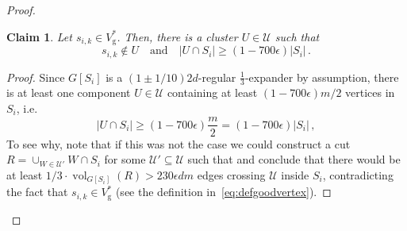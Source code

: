 \documentclass[epsfig,letter,11pt]{article}
\numberwithin{equation}{section}
\DeclareMathOperator{\vol}{vol}
\DeclareMathOperator*{\good}{g}
\newtheorem{claim}[theorem]{Claim}
\begin{document}
\begin{proof}
	\begin{claim}
		\label{claim:separateclusters}
		Let $s_{i,k} \in V^*_{{\good}} $. Then, there is a cluster $U \in \mathcal{U}$ such that
		\begin{equation*}
			s_{i,k} \notin U \quad \text{and} \quad |U\cap S_i| \ge \left(1-700{\epsilon}\right)  |S_i| \, .
		\end{equation*}
	\end{claim}
\begin{proof}
	Since $G[S_i]$ is a $(1 \pm 1/10)2d$-regular $\frac{1}{3}$-expander by assumption, there is at least one component $U \in \mathcal{U}$ containing at least $(1-700\epsilon)m/2$ vertices in $S_i$, i.e.
	\begin{equation}
		\label{eq:badcomp}
		|U \cap S_i| \ge \left(1-700{\epsilon}\right) \frac{m}{2}  = \left(1-700{\epsilon}\right)  |S_i| \, ,
	\end{equation}
	To see why, note that if this was not the case we could construct a cut $R = \cup_{W \in \mathcal{U}'} W \cap S_i$ for some $\mathcal{U}' \subseteq \mathcal{U}$ such that  and conclude that there would be at least $ 1/3\cdot \vol_{G[S_i]}(R) > 230\epsilon dm$ edges crossing $\mathcal{U}$ inside $S_i$, contradicting the fact that $s_{i,k} \in V^*_{{\good}} $ (see the definition in~\eqref{eq:defgoodvertex}).
	

\end{proof}
\end{proof}
\end{document}
